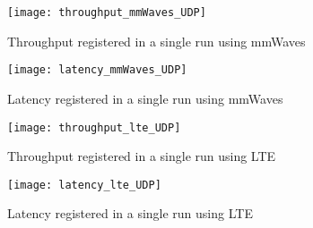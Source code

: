 \begin{figure}[ht]
  \texttt{[image: throughput\_mmWaves\_UDP]}
  \caption{Throughput registered in a single run using mmWaves}
  \label{fig:mmWaves-throughput-single}
\end{figure}

\begin{figure}[ht]
  \texttt{[image: latency\_mmWaves\_UDP]}
  \caption{Latency registered in a single run using mmWaves}
  \label{fig:mmWaves-latency-single}
\end{figure}

\begin{figure}[ht]
  \texttt{[image: throughput\_lte\_UDP]}
  \caption{Throughput registered in a single run using LTE}
  \label{fig:lte-throughput-single}
\end{figure}

\begin{figure}[ht]
  \texttt{[image: latency\_lte\_UDP]}
  \caption{Latency registered in a single run using LTE}
  \label{fig:lte-latency-single}
\end{figure}